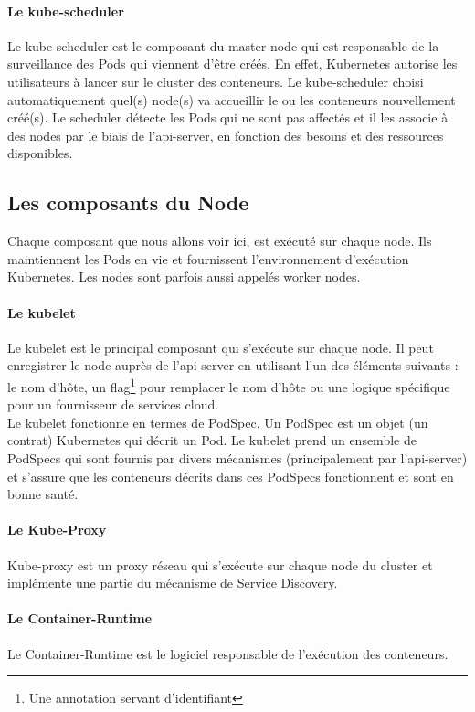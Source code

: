 \documentclass[11pt,fleqn]{book} %
\begin{document}
\paragraph*{Le kube-scheduler}
Le kube-scheduler est le composant du master node qui est responsable de la surveillance des Pods qui viennent d'être créés. En effet, Kubernetes autorise les utilisateurs à lancer sur le cluster des conteneurs. Le kube-scheduler choisi automatiquement quel(s) node(s) va accueillir le ou les conteneurs nouvellement créé(s). Le scheduler détecte les Pods qui ne sont pas affectés et il les associe à des nodes par le biais de l'api-server, en fonction des besoins et des ressources disponibles.

\subsection*{Les composants du Node}
Chaque composant que nous allons voir ici, est exécuté sur chaque node. Ils maintiennent les Pods en vie et fournissent l'environnement d'exécution Kubernetes. Les nodes sont parfois aussi appelés worker nodes.

\paragraph*{Le kubelet}
Le kubelet est le principal composant qui s'exécute sur chaque node. Il peut enregistrer le node auprès de l'api-server en utilisant l'un des éléments suivants : le nom d'hôte, un flag\footnote{Une annotation servant d'identifiant} pour remplacer le nom d'hôte ou une logique spécifique pour un fournisseur de services cloud.\\

Le kubelet fonctionne en termes de PodSpec. Un PodSpec est un objet (un contrat) Kubernetes qui décrit un Pod. Le kubelet prend un ensemble de PodSpecs qui sont fournis par divers mécanismes (principalement par l'api-server) et s'assure que les conteneurs décrits dans ces PodSpecs fonctionnent et sont en bonne santé.

\paragraph*{Le Kube-Proxy}
Kube-proxy est un proxy réseau qui s’exécute sur chaque node du cluster et implémente une partie du mécanisme de Service Discovery.

\paragraph*{Le Container-Runtime}
Le Container-Runtime est le logiciel responsable de l’exécution des conteneurs.\\
\end{document}
